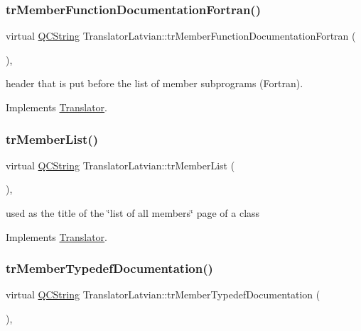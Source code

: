 \subsubsection{\texorpdfstring{trMemberFunctionDocumentationFortran()}{trMemberFunctionDocumentationFortran()}}
{\footnotesize\ttfamily virtual \mbox{\hyperlink{class_q_c_string}{Q\+C\+String}} Translator\+Latvian\+::tr\+Member\+Function\+Documentation\+Fortran (\begin{DoxyParamCaption}{ }\end{DoxyParamCaption})\hspace{0.3cm}{\ttfamily [inline]}, {\ttfamily [virtual]}}

header that is put before the list of member subprograms (Fortran). 

Implements \mbox{\hyperlink{class_translator}{Translator}}.

\mbox{\label{class_translator_latvian_a3f3598caec1fa2624a6b7917e80f9278}} 
\subsubsection{\texorpdfstring{trMemberList()}{trMemberList()}}
{\footnotesize\ttfamily virtual \mbox{\hyperlink{class_q_c_string}{Q\+C\+String}} Translator\+Latvian\+::tr\+Member\+List (\begin{DoxyParamCaption}{ }\end{DoxyParamCaption})\hspace{0.3cm}{\ttfamily [inline]}, {\ttfamily [virtual]}}

used as the title of the \char`\"{}list of all members\char`\"{} page of a class 

Implements \mbox{\hyperlink{class_translator}{Translator}}.

\mbox{\label{class_translator_latvian_ae9c91f54b92cd009e15964d3f5af69ca}} 
\subsubsection{\texorpdfstring{trMemberTypedefDocumentation()}{trMemberTypedefDocumentation()}}
{\footnotesize\ttfamily virtual \mbox{\hyperlink{class_q_c_string}{Q\+C\+String}} Translator\+Latvian\+::tr\+Member\+Typedef\+Documentation (\begin{DoxyParamCaption}{ }\end{DoxyParamCaption})\hspace{0.3cm}{\ttfamily [inline]}, {\ttfamily [virtual]}}

